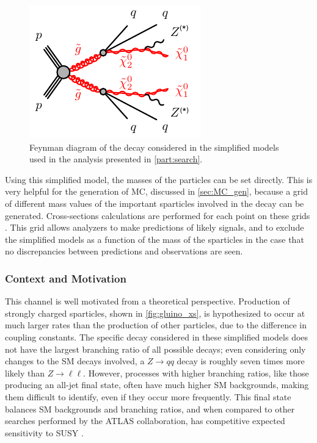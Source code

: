 \begin{centering}
\begin{figure}[!hbt]
\myfloatalign
\includegraphics[width=.9\linewidth]{figures/theory/gogo-qqqqZZN1N1.pdf}
\caption{Feynman diagram of the decay considered in the simplified models used in the analysis presented in \autoref{part:search}.}
\label{fig:simpmodel}
\end{figure}
\end{centering}

Using this simplified model, the masses of the particles can be set directly. This is very helpful for the generation of \ac{MC}, discussed in \autoref{sec:MC_gen}, because a grid of different mass values of the important sparticles involved in the decay can be generated. Cross-sections calculations are performed for each point on these grids \cite{1105.1110}. This grid allows analyzers to make predictions of likely signals, and to exclude the simplified models as a function of the mass of the sparticles in the case that no discrepancies between predictions and observations are seen. 


\subsubsection{Context and Motivation}

This channel is well motivated from a theoretical perspective. Production of strongly charged sparticles, shown in \autoref{fig:gluino_xs}, is hypothesized to occur at much larger rates than the production of other particles, due to the difference in coupling constants. The specific decay considered in these simplified models does not have the largest branching ratio of all possible decays; even considering only changes to the \ac{SM} decays involved, a $Z\rightarrow qq$ decay is roughly seven times more likely than $Z\rightarrow\ell\ell$. However, processes with higher branching ratios, like those producing an all-jet final state, often have much higher \ac{SM} backgrounds, making them difficult to identify, even if they occur more frequently. This final state balances \ac{SM} backgrounds and branching ratios, and when compared to other searches performed by the ATLAS collaboration, has competitive expected sensitivity to \ac{SUSY} \cite{summary_plot}. 

